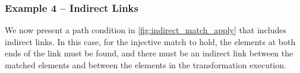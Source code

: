 \subsubsection{Example 4 -- Indirect Links}

%

We now present a path condition  in \cref{fig:indirect_match_apply} that includes indirect links. In this case, for the injective match to hold, the elements at both ends of the link must be found, and there must be an indirect link between the matched elements and between the elements in the transformation execution.

